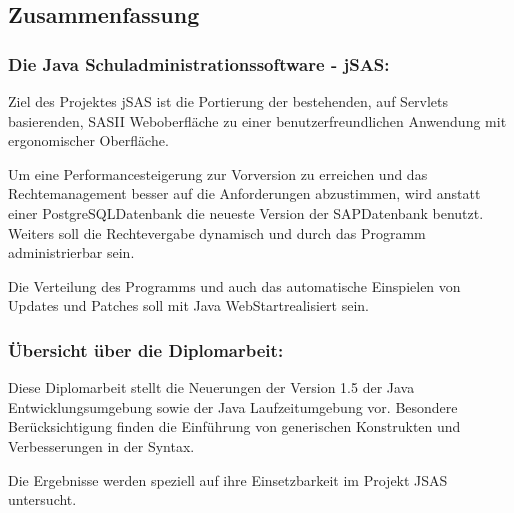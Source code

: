 \begin{flushleft}
	
	\subsection*{Zusammenfassung}

	\subsubsection*{Die Java Schuladministrationssoftware - jSAS:}
	
	Ziel des Projektes jSAS ist die Portierung der bestehenden, auf Servlets basierenden, SASII Weboberfläche zu einer benutzerfreundlichen Anwendung mit ergonomischer Oberfläche.
	
	Um eine Performancesteigerung zur Vorversion zu erreichen und das Rechtemanagement besser auf die Anforderungen abzustimmen, wird anstatt einer PostgreSQL\tm Datenbank die neueste Version der SAP\tm Datenbank benutzt. Weiters soll die Rechtevergabe dynamisch und durch das Programm administrierbar sein.
	
	Die Verteilung des Programms und auch das automatische Einspielen von Updates und Patches soll mit Java WebStart\tm realisiert sein.
	
	\subsubsection*{Übersicht über die Diplomarbeit:}
	
	Diese Diplomarbeit stellt die Neuerungen der Version 1.5 der Java Entwicklungsumgebung sowie der Java Laufzeitumgebung vor. Besondere Berücksichtigung finden die Einführung von generischen Konstrukten und Verbesserungen in der Syntax. 
	
	Die Ergebnisse werden speziell auf ihre Einsetzbarkeit im Projekt JSAS untersucht.
\end{flushleft}